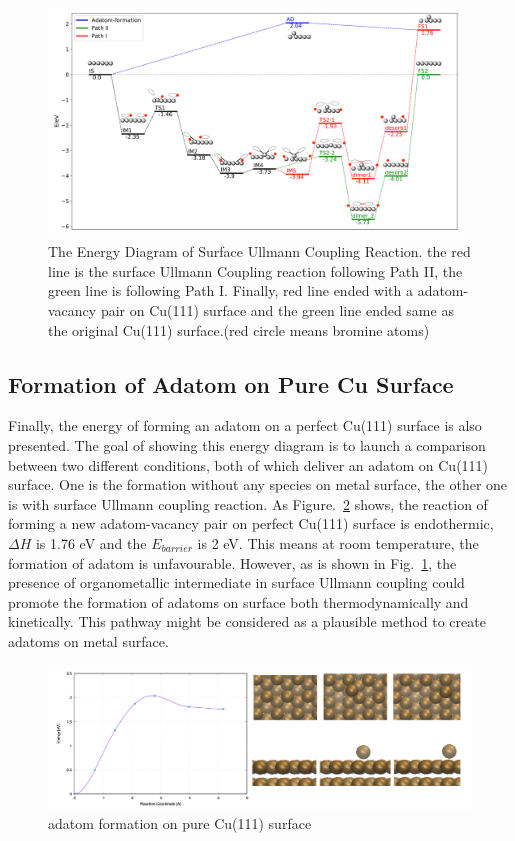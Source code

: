 \documentclass[%
 reprint,
 amsmath,amssymb,
 aps,
prb,
]{revtex4-1}
\begin{document}
\begin{figure}[hbt]
\centering
\includegraphics[width=0.98\textwidth]{Fig/completeenergy.png}
\caption{The Energy Diagram of Surface Ullmann Coupling Reaction.
the red line is the surface Ullmann Coupling reaction following Path II, the green line is following Path I. Finally, red line ended with a adatom-vacancy pair on Cu(111) surface and the green line ended same as the original Cu(111) surface.(red circle means bromine atoms)}
\label{fig:completeenergy}
\end{figure}

\subsection{Formation of Adatom on Pure Cu Surface}

Finally, the energy of forming an adatom on a perfect Cu(111) surface is also presented. The goal of showing this energy diagram is to launch a comparison between two different conditions, both of which deliver an adatom on Cu(111) surface. One is the formation without any species on metal surface, the other one is with surface Ullmann coupling reaction.
As Figure.~\ref{fig:pureadatomform} shows, the reaction of forming a new adatom-vacancy pair on perfect Cu(111) surface is endothermic, $\Delta H$ is 1.76 eV and the $E_{barrier}$ is 2 eV. This means at room temperature, the formation of adatom is unfavourable. 
However, as is shown in Fig.~\ref{fig:completeenergy}, the presence of organometallic intermediate in surface Ullmann coupling could promote the formation of adatoms on surface both thermodynamically and kinetically. This pathway might be considered as a plausible method to create adatoms on metal surface.

\begin{figure}[hbt]
\centering
\includegraphics[width=1.0\textwidth]{Fig/pureadatomform.png}
\caption{adatom formation on pure Cu(111) surface}
\label{fig:pureadatomform}
\end{figure}
\end{document}
